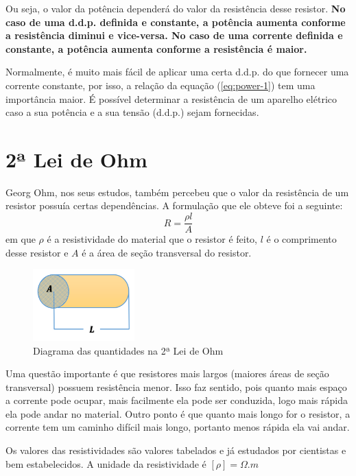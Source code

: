 \documentclass[12pt]{extarticle}
\newcommand{\<}{\langle}
\renewcommand{\>}{\rangle}
\theoremstyle{definition}
\begin{document}
Ou seja, o valor da potência dependerá do valor da resistência desse resistor. \textbf{No caso de uma d.d.p. definida e constante, a potência aumenta conforme a resistência diminui e vice-versa. No caso de uma corrente definida e constante, a potência aumenta conforme a resistência é maior.}

Normalmente, é muito mais fácil de aplicar uma certa d.d.p. do que fornecer uma corrente constante, por isso, a relação da equação (\ref{eq:power-1}) tem uma importância maior. É possível determinar a resistência de um aparelho elétrico caso a sua potência e a sua tensão (d.d.p.) sejam fornecidas.

\section{2ª Lei de Ohm}
Georg Ohm, nos seus estudos, também percebeu que o valor da resistência de um resistor possuía certas dependências. A formulação que ele obteve foi a seguinte:
\begin{equation}
    R = \frac{\rho l}{A}
\end{equation}
\noindent em que $\rho$ é a resistividade do material que o resistor é feito, $l$ é o comprimento desse resistor e $A$ é a área de seção transversal do resistor.
\begin{figure}[H]
    \centering
    \includegraphics[width=0.35\textwidth]{condutor-segunda-lei-de-ohm-1.png}
    \caption{Diagrama das quantidades na 2ª Lei de Ohm}
    \label{fig:ohm_2}
\end{figure}

Uma questão importante é que resistores mais largos (maiores áreas de seção transversal) possuem resistência menor. Isso faz sentido, pois quanto mais espaço a corrente pode ocupar, mais facilmente ela pode ser conduzida, logo mais rápida ela pode andar no material. Outro ponto é que quanto mais longo for o resistor, a corrente tem um caminho difícil mais longo, portanto menos rápida ela vai andar.

Os valores das resistividades são valores tabelados e já estudados por cientistas e bem estabelecidos. A unidade da resistividade é $[\rho] =\Omega.m$
\end{document}
